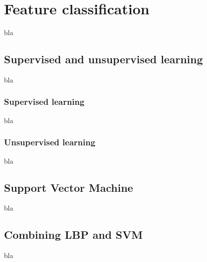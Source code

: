 \chapter{Feature classification}

\noindent bla

\section{Supervised and unsupervised learning}

\noindent bla
\newline

\subsection{Supervised learning}

\vspace{\baselineskip}
\noindent bla
\newline

\subsection{Unsupervised learning}

\vspace{\baselineskip}
\noindent bla
\newline

\section{Support Vector Machine}

\noindent bla
\newline

\section{Combining LBP and SVM}

\noindent bla
\newline
